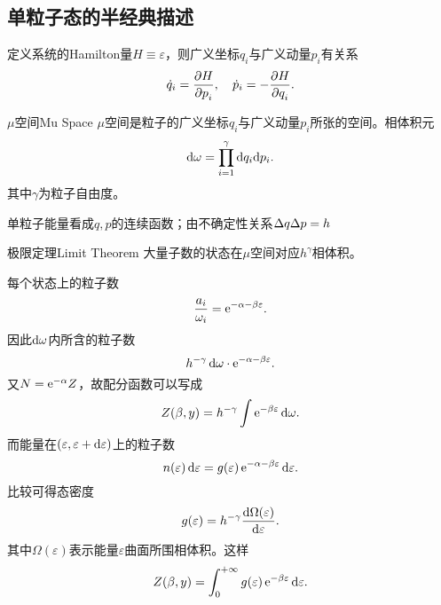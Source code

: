 \subsection{单粒子态的半经典描述}
定义系统的Hamilton量$H\equiv\varepsilon$，则广义坐标$q_i$与广义动量$p_i$有关系
\[
	\dot q_i=\pv H{p_i},\quad\dot p_i=-\pv H{q_i}.
\]
\begin{definition}{$\mu$空间}{Mu Space}
	$\mu$空间是粒子的广义坐标$q_i$与广义动量$p_i$所张的空间。相体积元
	\begin{align}
		\mathop{}\!\mathrm{d}\omega=\prod_{i=1}^\gamma\mathop{}\!\mathrm{d} q_i\mathrm{d} p_i.
	\end{align}
	其中$\gamma$为粒子自由度。
\end{definition}
单粒子能量看成$q,p$的连续函数；由不确定性关系$\Delta q\Delta p=h$
\begin{theorem}{极限定理}{Limit Theorem}
	大量子数的状态在$\mu$空间对应$h^\gamma$相体积。
\end{theorem}
每个状态上的粒子数
\begin{align}
	\frac{a_i}{\omega_i}=\mathop{}\!\mathrm{e}^{-\alpha-\beta\varepsilon}.
\end{align}
因此$\mathop{}\!\mathrm{d}\omega$内所含的粒子数
\[
	h^{-\gamma}\mathop{}\!\mathrm{d}\omega\cdot\mathop{}\!\mathrm{e}^{-\alpha-\beta\varepsilon}.
\]
又$N=\mathop{}\!\mathrm{e}^{-\alpha}Z$，故配分函数可以写成
\begin{align}
	Z(\beta,y)=h^{-\gamma}\int\mathop{}\!\mathrm{e}^{-\beta\varepsilon}\mathop{}\!\mathrm{d}\omega.
\end{align}
而能量在$\left(\varepsilon,\varepsilon+\mathop{}\!\mathrm{d}\varepsilon\right)$上的粒子数
\[
	n(\varepsilon)\mathop{}\!\mathrm{d}\varepsilon=g(\varepsilon)\mathop{}\!\mathrm{e}^{-\alpha-\beta\varepsilon}\mathop{}\!\mathrm{d}\varepsilon.
\]
比较可得态密度
\[
	g(\varepsilon)=h^{-\gamma}\frac{\mathrm{d}^{\;\!\!}\Omega(\varepsilon)}{\mathrm{d} \varepsilon^{\;\!\!}}.
\]
其中$\Omega(\varepsilon)$表示能量$\varepsilon$曲面所围相体积。这样
\begin{align}
	Z(\beta,y)=\int_0^{+\infty} g(\varepsilon)\mathop{}\!\mathrm{e}^{-\beta\varepsilon}\mathop{}\!\mathrm{d}\varepsilon.
\end{align}

